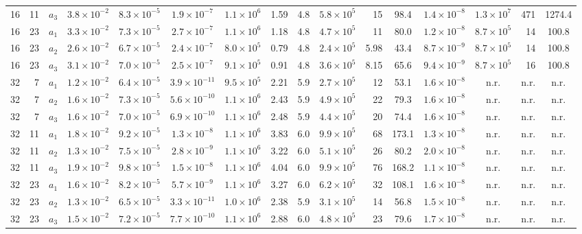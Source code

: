 \documentclass[aps,pra,superscriptaddress,floatfix,longbibliography,twocolumn]{revtex4-2}
\begin{document}
\begin{table}[t]
\begin{ruledtabular}
\begin{tabular}{rrrc|cccrc|crcc|crc}
16 & 11 & $a_3$ & $3.8\times10^{-2}$ & $8.3\times10^{-5}$ & $1.9\times10^{-7}$ & $1.1\times10^{6}$ & 1.59 & 4.8 & $5.8\times10^{5}$ & 15 & 98.4 & $1.4\times10^{-8}$ & $1.3\times10^{7}$ & 471 & 1274.4 \\
16 & 23 & $a_1$ & $3.3\times10^{-2}$ & $7.3\times10^{-5}$ & $2.7\times10^{-7}$ & $1.1\times10^{6}$ & 1.18 & 4.8 & $4.7\times10^{5}$ & 11 & 80.0 & $1.2\times10^{-8}$ & $8.7\times10^{5}$ & 14 & 100.8 \\
16 & 23 & $a_2$ & $2.6\times10^{-2}$ & $6.7\times10^{-5}$ & $2.4\times10^{-7}$ & $8.0\times10^{5}$ & 0.79 & 4.8 & $2.4\times10^{5}$ & 5.98 & 43.4 & $8.7\times10^{-9}$ & $8.7\times10^{5}$ & 14 & 100.8 \\
16 & 23 & $a_3$ & $3.1\times10^{-2}$ & $7.0\times10^{-5}$ & $2.5\times10^{-7}$ & $9.1\times10^{5}$ & 0.91 & 4.8 & $3.6\times10^{5}$ & 8.15 & 65.6 & $9.4\times10^{-9}$ & $8.7\times10^{5}$ & 16 & 100.8 \\
32 & 7 & $a_1$ & $1.2\times10^{-2}$ & $6.4\times10^{-5}$ & $3.9\times10^{-11}$ & $9.5\times10^{5}$ & 2.21 & 5.9 & $2.7\times10^{5}$ & 12 & 53.1 & $1.6\times10^{-8}$ & n.r. & n.r. & n.r. \\
32 & 7 & $a_2$ & $1.6\times10^{-2}$ & $7.3\times10^{-5}$ & $5.6\times10^{-10}$ & $1.1\times10^{6}$ & 2.43 & 5.9 & $4.9\times10^{5}$ & 22 & 79.3 & $1.6\times10^{-8}$ & n.r. & n.r. & n.r. \\
32 & 7 & $a_3$ & $1.6\times10^{-2}$ & $7.0\times10^{-5}$ & $6.9\times10^{-10}$ & $1.1\times10^{6}$ & 2.48 & 5.9 & $4.4\times10^{5}$ & 20 & 74.4 & $1.6\times10^{-8}$ & n.r. & n.r. & n.r. \\
32 & 11 & $a_1$ & $1.8\times10^{-2}$ & $9.2\times10^{-5}$ & $1.3\times10^{-8}$ & $1.1\times10^{6}$ & 3.83 & 6.0 & $9.9\times10^{5}$ & 68 & 173.1 & $1.3\times10^{-8}$ & n.r. & n.r. & n.r. \\
32 & 11 & $a_2$ & $1.3\times10^{-2}$ & $7.5\times10^{-5}$ & $2.8\times10^{-9}$ & $1.1\times10^{6}$ & 3.22 & 6.0 & $5.1\times10^{5}$ & 26 & 80.2 & $2.0\times10^{-8}$ & n.r. & n.r. & n.r. \\
32 & 11 & $a_3$ & $1.9\times10^{-2}$ & $9.8\times10^{-5}$ & $1.5\times10^{-8}$ & $1.1\times10^{6}$ & 4.04 & 6.0 & $9.9\times10^{5}$ & 76 & 168.2 & $1.1\times10^{-8}$ & n.r. & n.r. & n.r. \\
32 & 23 & $a_1$ & $1.6\times10^{-2}$ & $8.2\times10^{-5}$ & $5.7\times10^{-9}$ & $1.1\times10^{6}$ & 3.27 & 6.0 & $6.2\times10^{5}$ & 32 & 108.1 & $1.6\times10^{-8}$ & n.r. & n.r. & n.r. \\
32 & 23 & $a_2$ & $1.3\times10^{-2}$ & $6.5\times10^{-5}$ & $3.3\times10^{-11}$ & $1.0\times10^{6}$ & 2.38 & 5.9 & $3.1\times10^{5}$ & 14 & 56.8 & $1.5\times10^{-8}$ & n.r. & n.r. & n.r. \\
32 & 23 & $a_3$ & $1.5\times10^{-2}$ & $7.2\times10^{-5}$ & $7.7\times10^{-10}$ & $1.1\times10^{6}$ & 2.88 & 6.0 & $4.8\times10^{5}$ & 23 & 79.6 & $1.7\times10^{-8}$ & n.r. & n.r. & n.r. \\
\end{tabular}
\end{ruledtabular}
\end{table}
\end{document}
